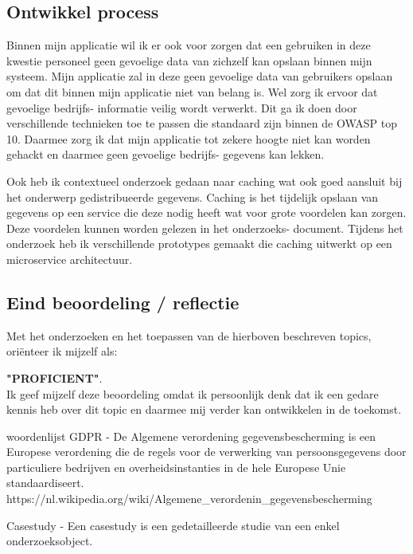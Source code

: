 \subsection{Ontwikkel process}
Binnen mijn applicatie wil ik er ook voor zorgen dat een gebruiken in deze kwestie personeel geen gevoelige data van zichzelf kan opslaan binnen mijn systeem.
Mijn applicatie zal in deze geen gevoelige data van gebruikers opslaan om dat dit binnen mijn applicatie niet van belang is.
Wel zorg ik ervoor dat gevoelige bedrijfs- informatie veilig wordt verwerkt.
Dit ga ik doen door verschillende technieken toe te passen die standaard zijn binnen de OWASP top 10.
Daarmee zorg ik dat mijn applicatie tot zekere hoogte niet kan worden gehackt en daarmee geen gevoelige bedrijfs- gegevens kan lekken.

Ook heb ik contextueel onderzoek gedaan naar caching wat ook goed aansluit bij het onderwerp gedistribueerde gegevens.
Caching is het tijdelijk opslaan van gegevens op een service die deze nodig heeft wat voor grote voordelen kan zorgen.
Deze voordelen kunnen worden gelezen in het onderzoeks- document.
Tijdens het onderzoek heb ik verschillende prototypes gemaakt die caching uitwerkt op een microservice architectuur.

\subsection{Eind beoordeling / reflectie}
Met het onderzoeken en het toepassen van de hierboven beschreven topics,
oriënteer ik mijzelf als:
\par\vspace{10pt}\textbf{\uppercase{"Proficient"}}.\\
Ik geef mijzelf deze beoordeling omdat ik persoonlijk denk dat ik een gedare kennis heb over dit topic en daarmee mij verder kan ontwikkelen in de toekomst.

\newpage
\bigskip
\bigskip
woordenlijst
GDPR - De Algemene verordening gegevensbescherming is een Europese verordening die de regels voor de verwerking van
persoonsgegevens door particuliere bedrijven en overheidsinstanties in de hele Europese Unie standaardiseert.
https://nl.wikipedia.org/wiki/Algemene\_verordenin\_gegevensbescherming

Casestudy -  Een casestudy is een gedetailleerde studie van een enkel onderzoeksobject.

